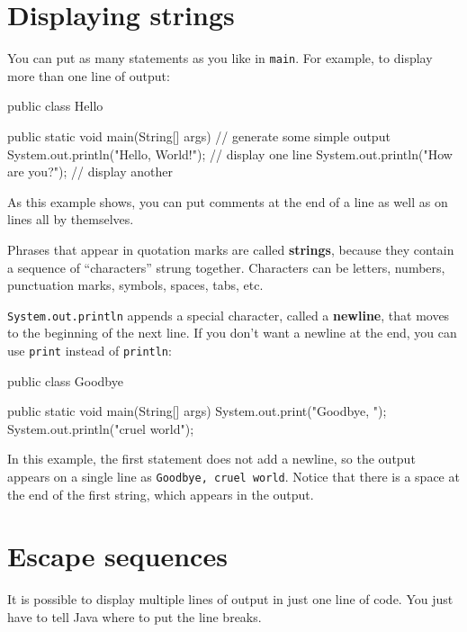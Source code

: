 \documentclass[12pt]{book}
\theoremstyle{exercise}
\newcommand{\java}[1]{\verb"#1"}
\begin{document}
\section{Displaying strings}

You can put as many statements as you like in \java{main}.
For example, to display more than one line of output:

\begin{code}
public class Hello {

    public static void main(String[] args) {
        // generate some simple output
        System.out.println("Hello, World!");  // display one line
        System.out.println("How are you?");   // display another
    }
}
\end{code}

As this example shows, you can put comments at the end of a line as well as on lines all by themselves.


Phrases that appear in quotation marks are called {\bf strings}, because they contain a sequence of ``characters'' strung together.
Characters can be letters, numbers, punctuation marks, symbols, spaces, tabs, etc.


\java{System.out.println} appends a special character, called a {\bf newline}, that moves to the beginning of the next line.
If you don't want a newline at the end, you can use \java{print} instead of \java{println}:

\begin{code}
public class Goodbye {

    public static void main(String[] args) {
        System.out.print("Goodbye, ");
        System.out.println("cruel world");
    }
}
\end{code}

\label{goodbye}

In this example, the first statement does not add a newline, so the output appears on a single line as {\tt Goodbye, cruel world}.
Notice that there is a space at the end of the first string, which appears in the output.


\section{Escape sequences}

It is possible to display multiple lines of output in just one line of code.
You just have to tell Java where to put the line breaks.
\end{document}
